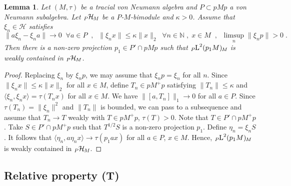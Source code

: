 \documentclass[a4paper,11pt]{amsart}
\numberwithin{equation}{section}
\newtheorem{lemma}[definition]{Lemma}
\begin{document}
\begin{lemma}\label{lem.sequence}
Let $(M,\tau)$ be a tracial von Neumann algebra and $P \subset pMp$ a von Neumann subalgebra. Let ${\mathord{\raisebox{-0.4ex}[0ex][0ex]{\scriptsize ${P}$}{{\mathcal{H}}}\hspace{-0.2ex}\raisebox{-0.4ex}[0ex][0ex]{\scriptsize ${M}$}}}$ be a $P$-$M$-bimodule and $\kappa > 0$. Assume that $\xi_n \in {\mathcal{H}}$ satisfies
$$\|a \xi_n - \xi_n a \| {\rightarrow} 0 \;\;\forall a \in P \;\; , \;\; \|\xi_n x \| {\leqslant} \kappa \|x\|_2 \;\;\forall n \in {\mathbb{N}} \;,\; x \in M \;\; , \;\; \limsup_n \|\xi_n p\| > 0 \; .$$
Then there is a non-zero projection $p_1 \in P' \cap pMp$ such that ${\mathord{\raisebox{-0.4ex}[0ex][0ex]{\scriptsize ${P}$}{{{\mathord{\text{\rm L}}}^2(p_1 M)}}\hspace{-0.2ex}\raisebox{-0.4ex}[0ex][0ex]{\scriptsize ${M}$}}}$ is weakly contained in ${\mathord{\raisebox{-0.4ex}[0ex][0ex]{\scriptsize ${P}$}{{\mathcal{H}}}\hspace{-0.2ex}\raisebox{-0.4ex}[0ex][0ex]{\scriptsize ${M}$}}}$.
\end{lemma}
\begin{proof}
Replacing $\xi_n$ by $\xi_n p$, we may assume that $\xi_n p = \xi_n$ for all $n$.
Since $\|\xi_n x\| {\leqslant} \kappa \|x\|_2$ for all $x \in M$, define $T_n \in p M^+ p$ satisfying $\|T_n \|{\leqslant} \kappa$ and $\langle \xi_n,\xi_n x\rangle = \tau(T_n x)$ for all $x \in M$. We have $\|[a,T_n]\|_1 {\rightarrow} 0$ for all $a \in P$. Since $\tau(T_n) = \| \xi_n\|^2$ and $\|T_n\|$ is bounded, we can pass to a subsequence and assume that $T_n {\rightarrow} T$ weakly with $T \in p M^+ p$, $\tau(T) > 0$. Note that $T \in P' \cap p M^+ p$. Take $S \in P' \cap p M^+ p$ such that $T^{1/2} S$ is a non-zero projection $p_1$. Define $\eta_n = \xi_n S$. It follows that $\langle \eta_n , a \eta_n x \rangle {\rightarrow} \tau(p_1 a x)$ for all $a \in P$, $x \in M$. Hence, ${\mathord{\raisebox{-0.4ex}[0ex][0ex]{\scriptsize ${P}$}{{{\mathord{\text{\rm L}}}^2(p_1 M)}}\hspace{-0.2ex}\raisebox{-0.4ex}[0ex][0ex]{\scriptsize ${M}$}}}$ is weakly contained in ${\mathord{\raisebox{-0.4ex}[0ex][0ex]{\scriptsize ${P}$}{{\mathcal{H}}}\hspace{-0.2ex}\raisebox{-0.4ex}[0ex][0ex]{\scriptsize ${M}$}}}$.
\end{proof}

\subsection{Relative property (T)}\label{subsec.relT}
\end{document}
